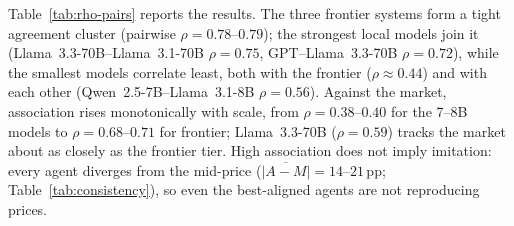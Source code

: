 Table~\ref{tab:rho-pairs} reports the results.  The three frontier systems form a
tight agreement cluster (pairwise $\rho = 0.78$--$0.79$); the strongest local models
join it (Llama~3.3-70B--Llama~3.1-70B $\rho=0.75$, GPT--Llama~3.3-70B $\rho=0.72$),
while the smallest models correlate least, both with the frontier ($\rho \approx 0.44$)
and with each other (Qwen~2.5-7B--Llama~3.1-8B $\rho=0.56$).  Against the market,
association rises monotonically with scale, from $\rho=0.38$--$0.40$ for the 7--8B models
to $\rho=0.68$--$0.71$ for frontier; Llama~3.3-70B ($\rho=0.59$) tracks the
market about as closely as the frontier tier. High association does not
imply imitation: every agent diverges from the mid-price
($\overline{|A{-}M|}=14$--$21$\,pp; Table~\ref{tab:consistency}), so even the
best-aligned agents are not reproducing prices.

